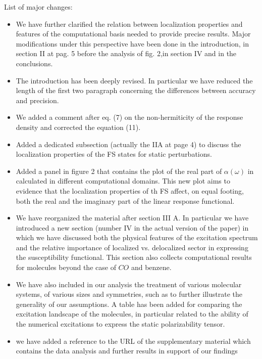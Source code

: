 \documentclass[11pt,a4paper]{article}
\begin{document}

List of major changes:
\begin{itemize}
 \item We have further clarified the relation between localization properties and features of the computational basis needed
 to provide precise results. Major modifications under this perspective have been done in the introduction, in section II at pag. 5 before the analysis of fig. 2,in section IV and in the conclusions.
 \item The introduction has been deeply revised. In particular we have reduced the length of the first two paragraph concerning the differences between accuracy and precision.
 \item We added a comment after eq. (7) on the non-hermiticity of the response density and corrected the equation (11).
 \item Added a dedicated subsection (actually the IIA at page 4)  to discuss the localization properties of the FS states for static perturbations.
 \item Added a panel in figure 2 that contains the plot of the real part of $\alpha(\omega)$ in calculated in different computational domains. This new plot aims to evidence that the localization
 properties of th FS affect, on equal footing, both the real and the imaginary part of the linear response functional.
 \item We have reorganized the material after section III A. In particular we have introduced a new section (number IV in the actual version of the paper) in which we have discussed both the physical features of the excitation spectrum and the relative importance of localized vs. delocalized sector in expressing the susceptibility functional. This section also collects computational results for molecules beyond the case of $CO$ and benzene.
 \item We have also included in our analysis the treatment of various molecular systems, of various sizes and symmetries, such as to further illustrate the generality of our assumptions. A table has been added for comparing the excitation landscape of the molecules, in particular related to the ability of the numerical excitations to
 express the static polarizability tensor.
 \item we have added a reference to the URL of the supplementary material which contains the data analysis and further results in support of our findings
\end{itemize}
\end{document}
